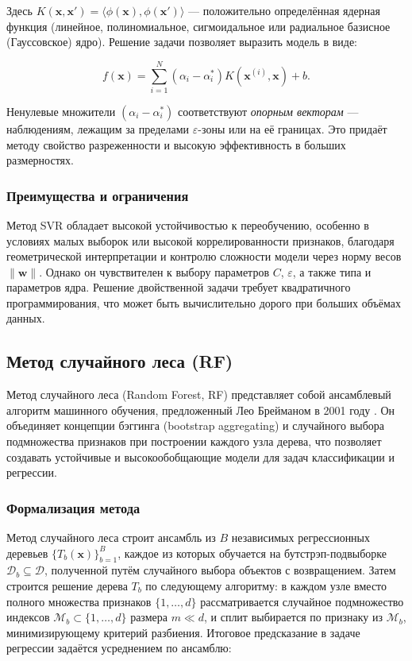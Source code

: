 Здесь $K(\mathbf{x}, \mathbf{x}') = \langle \phi(\mathbf{x}), \phi(\mathbf{x}') \rangle$ — положительно определённая ядерная функция (линейное, полиномиальное, сигмоидальное или радиальное базисное (Гауссовское) ядро). Решение задачи позволяет выразить модель в виде:

\begin{equation}
f(\mathbf{x}) = \sum_{i=1}^{N} (\alpha_i - \alpha_i^*) K(\mathbf{x}^{(i)}, \mathbf{x}) + b.
\end{equation}

Ненулевые множители $(\alpha_i - \alpha_i^*)$ соответствуют \textit{опорным векторам} --- наблюдениям, лежащим за пределами $\varepsilon$-зоны или на её границах. Это придаёт методу свойство разреженности и высокую эффективность в больших размерностях.

\subsubsection{Преимущества и ограничения}

Метод SVR обладает высокой устойчивостью к переобучению, особенно в условиях малых выборок или высокой коррелированности признаков, благодаря геометрической интерпретации и контролю сложности модели через норму весов $\|\mathbf{w}\|$. Однако он чувствителен к выбору параметров $C$, $\varepsilon$, а также типа и параметров ядра. Решение двойственной задачи требует квадратичного программирования, что может быть вычислительно дорого при больших объёмах данных.

\subsection{Метод случайного леса (RF)}

Метод случайного леса (Random Forest, RF) представляет собой ансамблевый алгоритм машинного обучения, предложенный Лео Брейманом в 2001 году \cite{Breiman2001}. Он объединяет концепции бэггинга (bootstrap aggregating) и случайного выбора подмножества признаков при построении каждого узла дерева, что позволяет создавать устойчивые и высокообобщающие модели для задач классификации и регрессии.

\subsubsection{Формализация метода}

Метод случайного леса строит ансамбль из $B$ независимых регрессионных деревьев $\{T_b(\mathbf{x})\}_{b=1}^B$, каждое из которых обучается на бутстрэп-подвыборке $\mathcal{D}_b \subseteq \mathcal{D}$, полученной путём случайного выбора объектов с возвращением. Затем строится решение дерева $T_b$ по следующему алгоритму: в каждом узле вместо полного множества признаков $\{1, \dots, d\}$ рассматривается случайное подмножество индексов $\mathcal{M}_b \subset \{1, \dots, d\}$ размера $m \ll d$, и сплит выбирается по признаку из $\mathcal{M}_b$, минимизирующему критерий разбиения. Итоговое предсказание в задаче регрессии задаётся усреднением по ансамблю:

